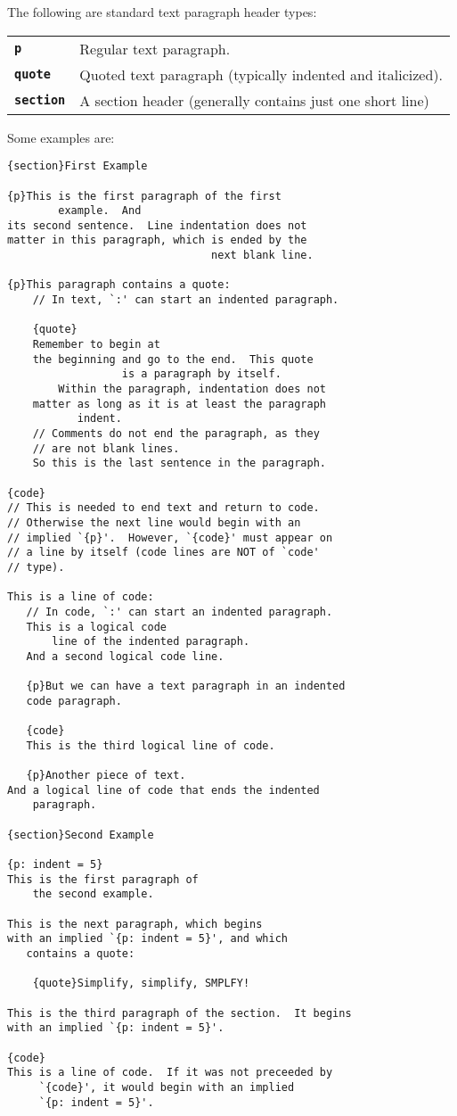 \documentclass[12pt]{article}
\makeatletter
\newcommand{\TT}[1]{{\tt \bfseries #1}}
\newcommand{\ttkey}[1]{\TT{#1}\index{#1@{\tt #1}}}
\newenvironment{indpar}[1][0.3in]%
	{\begin{list}{}%
		     {\setlength{\itemsep}{0in}%
		      \setlength{\topsep}{0in}%
		      \setlength{\parsep}{1ex}%
		      \setlength{\labelwidth}{#1}%
		      \setlength{\leftmargin}{#1}%
		      \addtolength{\leftmargin}{\labelsep}}%
	 \item}%
	{\end{list}}
\makeatother
\begin{document}
The following are standard text paragraph header types:
\begin{center}
\begin{tabular}{lp{4in}}
\ttkey{p} & Regular text paragraph. \\
\ttkey{quote} & Quoted text paragraph (typically indented and italicized). \\
\ttkey{section} & A section header (generally contains just one short line) \\
\end{tabular}
\end{center}

Some examples are:
\begin{indpar}\begin{verbatim}
{section}First Example

{p}This is the first paragraph of the first
        example.  And
its second sentence.  Line indentation does not
matter in this paragraph, which is ended by the
                                next blank line.

{p}This paragraph contains a quote:
    // In text, `:' can start an indented paragraph.

    {quote}
    Remember to begin at
    the beginning and go to the end.  This quote
                  is a paragraph by itself.
        Within the paragraph, indentation does not
    matter as long as it is at least the paragraph
           indent.
    // Comments do not end the paragraph, as they
    // are not blank lines.
    So this is the last sentence in the paragraph.

{code}
// This is needed to end text and return to code.
// Otherwise the next line would begin with an
// implied `{p}'.  However, `{code}' must appear on
// a line by itself (code lines are NOT of `code'
// type).

This is a line of code:
   // In code, `:' can start an indented paragraph.
   This is a logical code
       line of the indented paragraph.
   And a second logical code line.

   {p}But we can have a text paragraph in an indented
   code paragraph.

   {code}
   This is the third logical line of code.

   {p}Another piece of text.
And a logical line of code that ends the indented
    paragraph.

{section}Second Example

{p: indent = 5}
This is the first paragraph of
    the second example.

This is the next paragraph, which begins
with an implied `{p: indent = 5}', and which
   contains a quote:

    {quote}Simplify, simplify, SMPLFY!

This is the third paragraph of the section.  It begins
with an implied `{p: indent = 5}'.

{code}
This is a line of code.  If it was not preceeded by
     `{code}', it would begin with an implied
     `{p: indent = 5}'.
\end{verbatim}\end{indpar}
\end{document}
